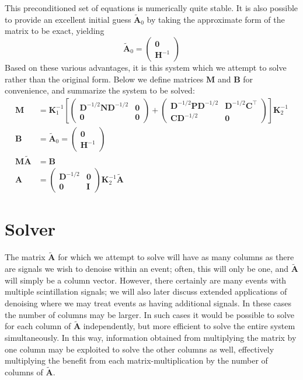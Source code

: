 This preconditioned set of equations is numerically quite stable.  It is also possible to provide an excellent initial guess $\mathbf{\widetilde{A}}_0$ by taking the approximate form of the matrix to be exact, yielding
\begin{equation}
\mathbf{\widetilde{A}}_0 = \begin{pmatrix}\mathbf{0}\\ \mathbf{H}^{-1}\end{pmatrix}
\end{equation}
Based on these various advantages, it is this system which we attempt to solve rather than the original form.  Below we define matrices $\mathbf{M}$ and $\mathbf{B}$ for convenience, and summarize the system to be solved:
\begin{subequations}\begin{align}
\mathbf{M} &= \mathbf{K}_1^{-1} 
\left[
\begin{pmatrix}\mathbf{D}^{-1/2}\mathbf{ND}^{-1/2}&\mathbf{0}\\ \mathbf{0}&\mathbf{0}\end{pmatrix}
+
\begin{pmatrix}\mathbf{D}^{-1/2}\mathbf{PD}^{-1/2}&\mathbf{D}^{-1/2}\mathbf{C}^\top \\ \mathbf{CD}^{-1/2}&\mathbf{0}\end{pmatrix}
\right]
\mathbf{K}_2^{-1}\\
\mathbf{B} &= \mathbf{\widetilde{A}}_0 = \begin{pmatrix}\mathbf{0}\\ \mathbf{H}^{-1}\end{pmatrix}\\
\mathbf{M\widetilde{A}} &= \mathbf{B}\\
\mathbf{A} &= \begin{pmatrix}\mathbf{D}^{-1/2}&\mathbf{0}\\ \mathbf{0}&\mathbf{I}\end{pmatrix}\mathbf{K}_2^{-1}\mathbf{\widetilde{A}}
\end{align}\end{subequations}


\section{Solver}

The matrix $\mathbf{\widetilde{A}}$ for which we attempt to solve will have as many columns as there are signals we wish to denoise within an event; often, this will only be one, and $\mathbf{\widetilde{A}}$ will simply be a column vector.  However, there certainly are many events with multiple scintillation signals; we will also later discuss extended applications of denoising where we may treat events as having additional signals.  In these cases the number of columns may be larger.  In such cases it would be possible to solve for each column of $\mathbf{\widetilde{A}}$ independently, but more efficient to solve the entire system simultaneously.  In this way, information obtained from multiplying the matrix by one column may be exploited to solve the other columns as well, effectively multiplying the benefit from each matrix-multiplication by the number of columns of $\mathbf{\widetilde{A}}$.

